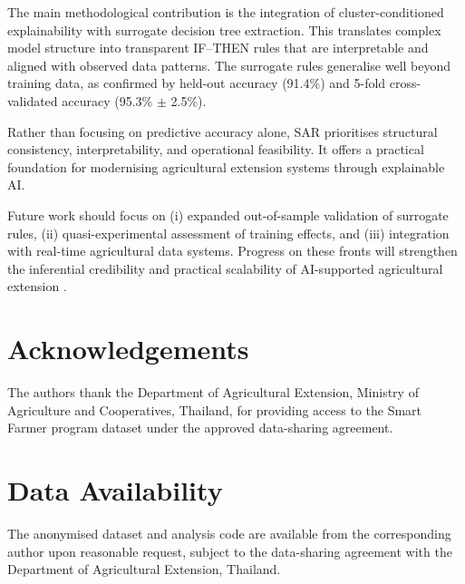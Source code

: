\documentclass[3p,twocolumn,authoryear]{elsarticle}
\begin{document}
The main methodological contribution is the integration of
cluster-conditioned explainability with surrogate decision tree extraction.
This translates complex model structure into transparent IF--THEN rules
that are interpretable and aligned with observed data patterns.
The surrogate rules generalise well beyond training data, as confirmed
by held-out accuracy (91.4\%) and 5-fold cross-validated accuracy
(95.3\% $\pm$ 2.5\%).

Rather than focusing on predictive accuracy alone, SAR prioritises
structural consistency, interpretability, and operational feasibility.
It offers a practical foundation for modernising agricultural extension
systems through explainable AI.

Future work should focus on (i) expanded out-of-sample validation of
surrogate rules, (ii) quasi-experimental assessment of training effects,
and (iii) integration with real-time agricultural data systems.
Progress on these fronts will strengthen the inferential credibility
and practical scalability of AI-supported agricultural extension
\citep{yang2025,zhang2026}.

\section*{Acknowledgements}

The authors thank the Department of Agricultural Extension, Ministry of
Agriculture and Cooperatives, Thailand, for providing access to the Smart
Farmer program dataset under the approved data-sharing agreement.

\section*{Data Availability}

The anonymised dataset and analysis code are available from the corresponding
author upon reasonable request, subject to the data-sharing agreement with
the Department of Agricultural Extension, Thailand.
\end{document}
